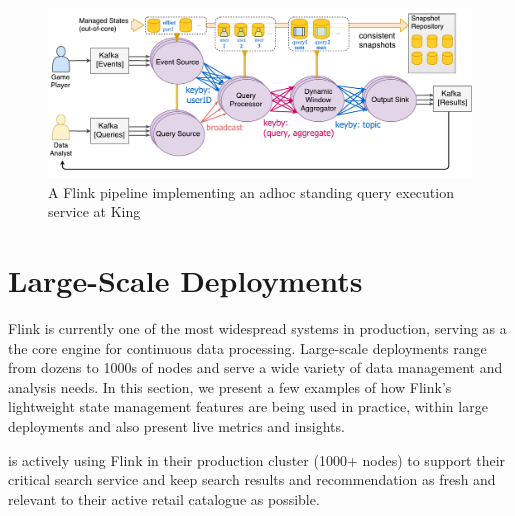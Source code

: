 \begin{figure}[t]
\centering
\includegraphics[width=\textwidth]{figures/rbea.pdf}
\caption{A Flink pipeline implementing an adhoc standing query execution service at King} 
\label{fig:rbea}
\vspace{-4mm}
\end{figure}

\section{Large-Scale Deployments}
\label{sec:evaluation}


Flink is currently one of the most widespread systems in production, serving as a the core engine for continuous data processing. Large-scale deployments range from dozens to 1000s of nodes and serve a wide variety of data management and analysis needs. In this section, we present a few examples of how Flink's lightweight state management features are being used in practice, within large deployments and also present live metrics and insights.


 is actively using Flink in their production cluster (1000+ nodes) to support their critical search service \cite{CUSTOM:web/alibaba} and keep search results and recommendation as fresh and relevant to their active retail catalogue as possible.






